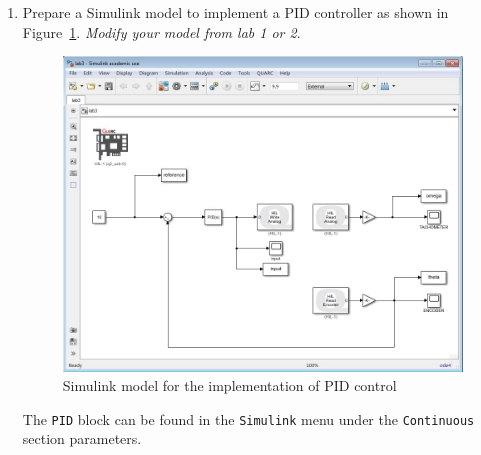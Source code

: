 \begin{enumerate}
    \item Prepare a \textsf{Simulink} model to implement a PID controller as
          shown in Figure~\ref{fig:model6}\@. \emph{Modify your model from lab 1 or 2}.
          \begin{figure}[htbp]
              \centering
              \includegraphics[width=0.6\hsize]{pix/lab3.jpg}
              \caption{\textsf{Simulink} model for the implementation of PID control}\label{fig:model6}
          \end{figure}%
          The \verb|PID| block can be found in the \verb|Simulink| menu under the
          \verb|Continuous| section parameters.


\end{enumerate}
